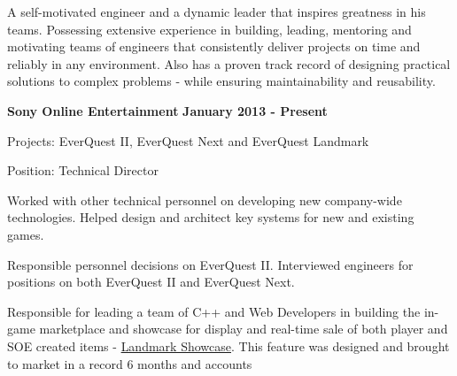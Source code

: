 \documentclass{article}
\begin{document}
\par
\vspace{2\baselineskip}
\par
A self-motivated engineer and a dynamic leader that inspires greatness in his teams.  Possessing extensive
experience in building, leading, mentoring and motivating teams of engineers that consistently deliver projects on time and
reliably in any environment.  Also has a proven track record of designing practical solutions to complex problems - while
ensuring maintainability and reusability.
\par
\vspace{\baselineskip}
\vspace{\baselineskip}
{\bf Sony Online Entertainment}
\hfill {\bf January 2013 - Present}
\vspace{.03in}
\par
Projects: EverQuest II, EverQuest Next and EverQuest Landmark
\par
Position: Technical Director
\vspace{.03in}
\par
Worked with other technical personnel on developing new company-wide
technologies.  Helped design and architect key systems for new and existing
games.
\par
\vspace{\baselineskip}
Responsible personnel decisions on EverQuest II.  Interviewed engineers for
positions on both EverQuest II and EverQuest Next.
\par
\vspace{\baselineskip}
Responsible for leading a team of C++ and Web Developers in building the
in-game marketplace and showcase for display and real-time sale of both player and SOE created items - 
\href{https://www.landmarkthegame.com/showcase}{Landmark Showcase}.  This
feature was designed and brought to market in a record 6 months and accounts
\end{document}
